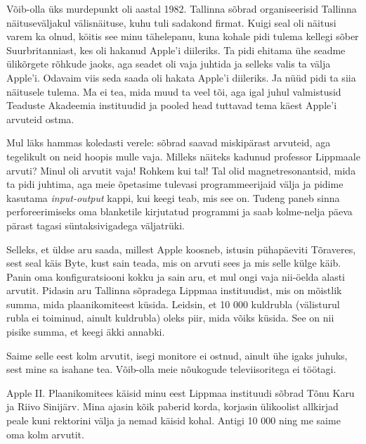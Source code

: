 Võib-olla üks murdepunkt oli aastal 1982. Tallinna 
sõbrad organiseerisid Tallinna näituseväljakul välisnäituse, kuhu tuli sadakond firmat. Kuigi seal oli näitusi varem ka olnud, köitis see minu tähelepanu, kuna
kohale pidi tulema kellegi sõber 
Suurbritanniast, kes oli hakanud Apple'i diileriks. Ta pidi ehitama ühe seadme ülikõrgete rõhkude jaoks, 
aga seadet oli vaja juhtida ja selleks valis ta välja Apple'i. 
Odavaim viis seda saada oli hakata Apple'i diileriks. Ja nüüd pidi ta siia
näitusele tulema. Ma ei tea, mida muud ta veel tõi, aga igal juhul valmistusid
Teaduste Akadeemia instituudid ja pooled head 
tuttavad tema käest Apple'i arvuteid ostma. 

Mul läks hammas 
koledasti verele: sõbrad saavad miskipärast arvuteid, aga tegelikult on neid 
hoopis mulle vaja. Milleks näiteks kadunud professor Lippmaale arvuti? Minul oli arvutit vaja! Rohkem
kui tal! Tal olid magnetresonantsid, mida ta pidi juhtima, 
aga meie õpetasime tulevasi programmeerijaid välja ja pidime kasutama 
\emph{input-output} kappi, kui keegi teab, mis see on. Tudeng paneb sinna
perforeerimiseks oma blanketile kirjutatud programmi ja saab kolme-nelja päeva 
pärast tagasi süntaksivigadega väljatrüki. 

Selleks, et üldse aru saada, millest 
Apple koosneb, istusin pühapäeviti Tõraveres, 
sest seal käis Byte, kust sain teada, 
mis on arvuti sees ja mis selle külge käib. Panin oma konfiguratsiooni kokku ja sain aru, et mul ongi vaja nii-öelda
alasti arvutit. Pidasin aru Tallinna sõpradega Lippmaa 
instituudist, mis on 
mõistlik summa, mida plaanikomiteest küsida. Leidsin, et 10 000 kuldrubla (välisturul rubla 
ei toiminud, ainult kuldrubla) oleks piir, mida võiks küsida. See on 
nii pisike summa, et keegi äkki annabki. 

Saime selle eest kolm arvutit, isegi 
monitore ei ostnud, ainult ühe igaks juhuks, sest mine sa isahane tea. Võib-olla meie 
nõukogude televiisoritega ei töötagi. 


Apple II. Plaanikomitees käisid minu eest Lippmaa 
instituudi sõbrad Tõnu Karu ja Riivo 
Sinijärv. Mina ajasin kõik paberid korda, korjasin 
ülikoolist allkirjad peale kuni rektorini välja ja nemad käisid kohal. Antigi 10 000 ning me saime oma kolm arvutit.

